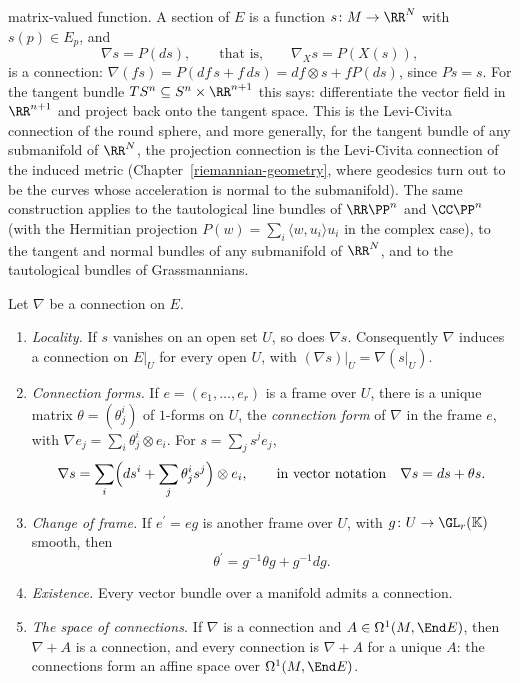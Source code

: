 \begin{example}
\begin{enumerate}
matrix-valued function. A section of $E$ is a function $s \colon M \to \RR^N$ with $s(p) \in E_p$, and
\[
\nabla s = P(ds), \qquad\text{that is,}\qquad \nabla_Xs = P(X(s)),
\]
is a connection: $\nabla(fs) = P(df\,s + f\,ds) = df \otimes s + fP(ds)$, since $Ps = s$. For the tangent bundle $TS^n \subseteq S^n \times \RR^{n+1}$ this says: differentiate
the vector field in $\RR^{n+1}$ and project back onto the tangent space. This is the Levi-Civita connection of the round sphere, and more generally, for the tangent bundle of any submanifold of
$\RR^N$, the projection connection is the Levi-Civita connection of the induced metric (Chapter~\ref{riemannian-geometry}, where geodesics turn out to be the curves whose acceleration is normal to the
submanifold). The same
construction applies to the tautological line bundles of $\RR\PP^n$ and $\CC\PP^n$ (with the Hermitian projection $P(w) = \sum_i\langle w, u_i\rangle u_i$ in the complex case),
to the tangent and normal bundles of any submanifold of $\RR^N$, and to the tautological bundles of Grassmannians.
\end{enumerate}
\end{example}

\begin{proposition}\label{connections:proposition-connections-exist}
Let $\nabla$ be a connection on $E$.
\begin{enumerate}
\item \emph{Locality.} If $s$ vanishes on an open set $U$, so does $\nabla s$. Consequently $\nabla$ induces a connection on $E|_U$ for every open $U$, with
$(\nabla s)|_U = \nabla(s|_U)$.
\item \emph{Connection forms.} If $e = (e_1, \ldots, e_r)$ is a frame over $U$, there is a unique matrix $\theta = (\theta^i_j)$ of $1$-forms on $U$, the \emph{connection form} of
$\nabla$ in the frame $e$, with $\nabla e_j = \sum_i\theta^i_j \otimes e_i$. For $s = \sum_js^je_j$,
\[
\nabla s = \sum_i\Bigl(ds^i + \sum_j\theta^i_js^j\Bigr) \otimes e_i, \qquad\text{in vector notation}\quad \nabla s = ds + \theta s .
\]
\item \emph{Change of frame.} If $e^{\prime} = eg$ is another frame over $U$, with $g \colon U \to \GL_r(\mathbb{K})$ smooth, then
\[
\theta^{\prime} = g^{-1}\theta g + g^{-1}dg .
\]
\item \emph{Existence.} Every vector bundle over a manifold admits a connection.
\item \emph{The space of connections.} If $\nabla$ is a connection and $A \in \Omega^1(M, \End E)$, then $\nabla + A$ is a connection, and every connection is $\nabla + A$ for a
unique $A$: the connections form an affine space over $\Omega^1(M, \End E)$.
\end{enumerate}
\end{proposition}

